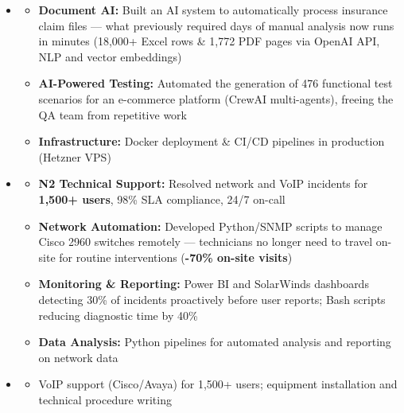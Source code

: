 \documentclass[11pt,a4paper]{article}
\renewcommand{\itemspace}{\vspace{0.2em}}
\begin{document}
\begin{itemize}[leftmargin=1em, label={}]
    \item
    \begin{itemize}[leftmargin=1.5em, label={\textbullet}, nosep]
        \item \textbf{Document AI:} Built an AI system to automatically process insurance claim files — what previously required days of manual analysis now runs in minutes (18,000+ Excel rows \& 1,772 PDF pages via OpenAI API, NLP and vector embeddings)
        \item \textbf{AI-Powered Testing:} Automated the generation of 476 functional test scenarios for an e-commerce platform (CrewAI multi-agents), freeing the QA team from repetitive work
        \item \textbf{Infrastructure:} Docker deployment \& CI/CD pipelines in production (Hetzner VPS)
    \end{itemize}

    \itemspace
    \item
    \begin{itemize}[leftmargin=1.5em, label={\textbullet}, nosep]
        \item \textbf{N2 Technical Support:} Resolved network and VoIP incidents for \textbf{1,500+ users}, 98\% SLA compliance, 24/7 on-call
        \item \textbf{Network Automation:} Developed Python/SNMP scripts to manage Cisco 2960 switches remotely — technicians no longer need to travel on-site for routine interventions (\textbf{-70\% on-site visits})
        \item \textbf{Monitoring \& Reporting:} Power BI and SolarWinds dashboards detecting 30\% of incidents proactively before user reports; Bash scripts reducing diagnostic time by 40\%
        \item \textbf{Data Analysis:} Python pipelines for automated analysis and reporting on network data
    \end{itemize}

    \itemspace
    \item
    \begin{itemize}[leftmargin=1.5em, label={\textbullet}, nosep]
        \item VoIP support (Cisco/Avaya) for 1,500+ users; equipment installation and technical procedure writing
    \end{itemize}


\end{itemize}
\end{document}
